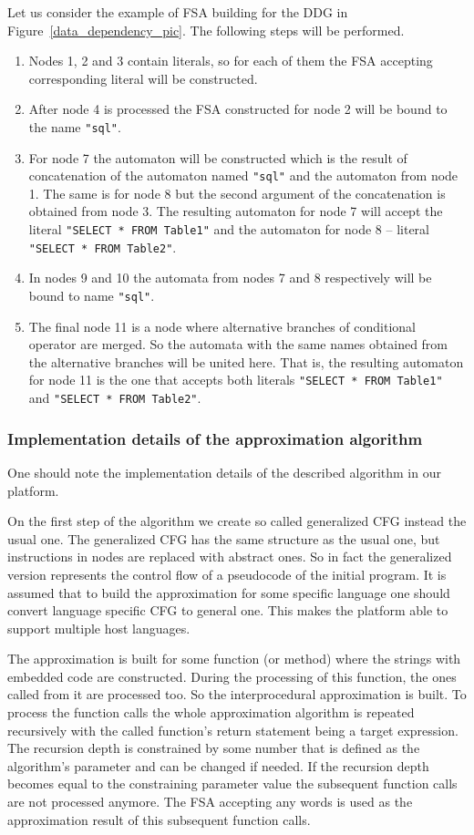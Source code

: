 Let us consider the example of FSA building for the DDG in Figure~\ref{data_dependency_pic}. The following steps will be performed.
\begin{enumerate}
\item Nodes 1, 2 and 3 contain literals, so for each of them the FSA accepting corresponding literal will be constructed.
\item After node 4 is processed the FSA constructed for node 2 will be bound to the name \verb|"sql"|.
\item For node 7 the automaton will be constructed which is the result of concatenation of the automaton named \verb|"sql"| and the automaton from node 1. The same is for node 8 but the second argument of the concatenation is obtained from node 3. The resulting automaton for node 7 will accept the literal  \texttt{"SELECT * FROM Table1"} and the automaton for node 8 -- literal \texttt{"SELECT * FROM Table2"}.
\item In nodes 9 and 10 the automata from nodes 7 and 8 respectively will be bound to name \verb|"sql"|.
\item The final node 11 is a node where alternative branches of conditional operator are merged. So the automata with the same names obtained from the alternative branches will be united here. That is, the resulting automaton for node 11 is the one that accepts both literals \texttt{"SELECT * FROM Table1"} and \texttt{"SELECT * FROM Table2"}.

\end{enumerate}

\subsubsection{Implementation details of the approximation algorithm}

One should note the implementation details of the described algorithm in our platform.

On the first step of the algorithm we create so called generalized CFG instead the usual one. The generalized CFG has the same structure as the usual one, but instructions in nodes are replaced with abstract ones. So in fact the generalized version represents the control flow of a pseudocode of the initial program. It is assumed that to build the approximation for some specific language one should convert language specific CFG to general one. This makes the platform able to support multiple host languages.

The approximation is built for some function (or method) where the strings with embedded code are constructed. During the processing of this function, the ones called from it are processed too. So the interprocedural approximation is built. To process the function calls the whole approximation algorithm is repeated recursively with the called function's return statement being a target expression. The recursion depth is constrained by some number that is defined as the algorithm's parameter and can be changed if needed. If the recursion depth becomes equal to the constraining parameter value the subsequent function calls are not processed anymore. The FSA accepting any words is used as the approximation result of this subsequent function calls.

